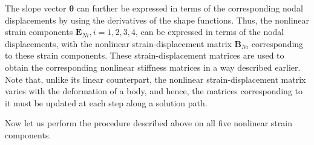 The slope vector $\boldsymbol{\theta}$ can further be expressed in terms of the corresponding nodal displacements by using the derivatives of the shape functions. Thus, the nonlinear strain components $\mathbf{E}_{Ni}, i=1, 2, 3, 4$, can be expressed in terms of the nodal displacements, with the nonlinear strain-displacement matrix $\mathbf{B}_{Ni}$ corresponding to these strain components. These strain-displacement matrices are used to obtain the corresponding nonlinear stiffness matrices in a way described earlier.  Note that, unlike its linear counterpart, the nonlinear strain-displacement matrix varies with the deformation of a body, and hence, the matrices corresponding to it must be updated at each step along a solution path.

Now let us perform the procedure described above on all five nonlinear strain components.

